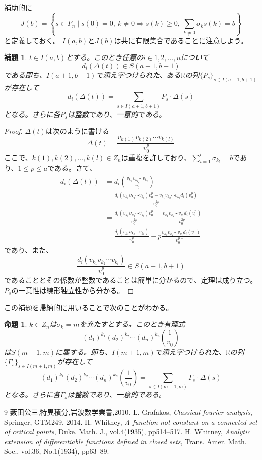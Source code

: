 \documentclass[leqno]{jsarticle}
\newtheorem{prop}[thm]{命題}
\newtheorem{lem}[thm]{補題}
\newcommand{\To}{\Longrightarrow}
\newcommand{\rr}{\mathbb{R}}
\begin{document}
補助的に
\[
J(b)=\left\{s\in F_n\mid s(0)=0, \  k\neq0\To s(k)\ge0,\ \sum_{k\neq 0}\sigma_ks(k)=b\right\}
\]
と定義しておく。
$I(a,b)$と$J(b)$は共に有限集合であることに注意しよう。
\begin{lem}
$t\in I(a,b)$とする。このとき任意の$i\in{1,2,\dots, n}$について
\[
d_i(\Delta(t))\in S(a+1, b+1)
\]
である即ち、$I(a+1, b+1)$で添え字つけられた、ある$\rr$の列$\{P_s\}_{s\in I(a+1, b+1)}$が存在して
\[
d_i(\Delta(t))=\sum_{s\in I(a+1, b+1)}P_s\cdot\Delta(s)
\]
となる。さらに各$P_s$は整数であり、一意的である。
\end{lem}
\begin{proof}
$\Delta(t)$は次のように書ける
\[
\Delta(t)=\frac{v_{k(1)}v_{k(2)}\cdots v_{k(l)}}{v_0^{p}}
\]
ここで、$k(1),k(2), \dots, k(l)\in Z_n$は重複を許しており、$\sum_{i=1}^{l}\sigma_{k_l}=b$であり、$1\le p\le a$である。さて、
\begin{align*}
d_i(\Delta(t))
&=d_i\left(\frac{v_{k_1}v_{k_2}\cdots v_{k_l}}{v_0^{p}}\right)\\
&=\frac{d_i(v_{k_1}v_{k_2}\cdots v_{k_l})v_0^p-v_{k_1}v_{k_2}\cdots v_{k_l}d_i(v_0^p)}{v_0^{2p}}\\
&=\frac{d_i(v_{k_1}v_{k_2}\cdots v_{k_l})v_0^p}{v_0^{2p}}-\frac{v_{k_1}v_{k_2}\cdots v_{k_l}d_i(v_0^p)}{v_0^{2p}}\\
&=\frac{d_i(v_{k_1}v_{k_2}\cdots v_{k_l})}{v_0^{p}}-p\frac{v_{k_1}v_{k_2}\cdots v_{k_l}d_i(v_0)}{v_0^{p+1}}
\end{align*}
であり、また、
\[
\frac{d_i(v_{k_1}v_{k_2}\cdots v_{k_l})}{v_0^{p}}\in S(a+1,b+1)
\]
であることとその係数が整数であることは簡単に分かるので、定理は成り立つ。$P_s$の一意性は線形独立性から分かる。
\end{proof}
この補題を帰納的に用いることで次のことがわかる。
\begin{prop}\label{gyakusuu}
$k\in Z_n$は$\sigma_k=m$を充たすとする。このとき有理式
\[
(d_1)^{k_1}(d_2)^{k_2}\cdots (d_n)^{k_n}\left(\frac{1}{v_0}\right)
\]
は$S(m+1,m)$に属する。即ち、$I(m+1, m)$で添え字つけられた、$\rr$の列$\{\Gamma_s\}_{s\in I(m+1, m)}$が存在して
\[
(d_1)^{k_1}(d_2)^{k_2}\cdots (d_n)^{k_n}\left(\frac{1}{v_0}\right)=\sum_{s\in I(m+1, m)}\Gamma_s\cdot\Delta(s)
\]
となる。さらに各$\Gamma_s$は整数であり、一意的である。
\end{prop}



\begin{thebibliography}{9}
薮田公三,特異積分,岩波数学業書,2010.
L. Grafakos, \textit{Classical fourier analysis}, Springer, GTM249, 2014.
H. Whitney, \textit{A function not constant on a connected set of critical points}, Duke. Math. J., vol.4(1935), pp514--517.
H. Whitney, \textit{Analytic extension of differentiable functions defined in closed sets}, Trans. Amer. Math. Soc., vol.36, No.1(1934), pp63--89.
\end{thebibliography}




			
\end{document}
